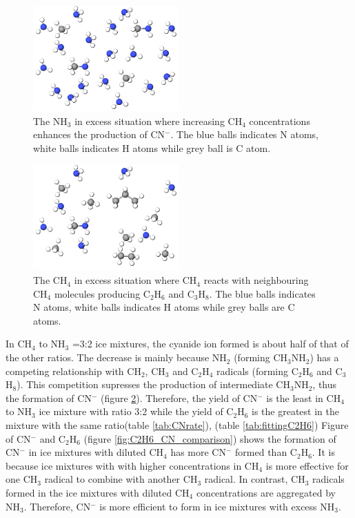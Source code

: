 \begin{figure}
\centering
\includegraphics[width=0.5\textwidth]{figures/ammonia_dominating.png}
\caption{The NH$_3$ in excess situation where increasing CH$_4$ concentrations enhances the production of CN$^-$. The blue balls indicates N atoms, white balls indicates H atoms while grey ball is C atom.}
\label{fig:NH3_dominated}
\end{figure}


\begin{figure}
\centering
\includegraphics[width=0.5\textwidth]{figures/methane_dominating.png}
\caption{The CH$_4$ in excess situation where CH$_4$ reacts with neighbouring CH$_4$ molecules producing C$_2$H$_6$ and C$_3$H$_8$. The blue balls indicates N atoms, white balls indicates H atoms while grey balls are C atoms.}
\label{fig:CH4_dominated}
\end{figure}

In CH$_4$ to NH$_3$ =3:2 ice mixtures, the cyanide ion formed is about half of that of the other ratios. The decrease is mainly because NH$_2$ (forming CH$_3$NH$_2$) has a competing relationship with CH$_2$, CH$_3$ and C$_2$H$_4$ radicals (forming C$_2$H$_6$ and C$_3$H$_8$). This competition supresses the production of intermediate CH$_3$NH$_2$, thus the formation of CN$^-$ (figure \ref{fig:CH4_dominated}). Therefore, the yield of CN$^-$ is the least in CH$_4$ to NH$_3$ ice mixture with ratio 3:2 while the yield of C$_2$H$_6$ is the greatest in the mixture with the same ratio(table \ref{tab:CNrate}), (table \ref{tab:fittingC2H6}) Figure of CN$^-$ and C$_2$H$_6$ (figure \ref{fig:C2H6_CN_comparison}) shows the formation of CN$^-$ in ice mixtures with diluted CH$_4$ has more CN$^-$ formed than C$_2$H$_6$. It is because ice mixtures with with higher concentrations in CH$_4$ is more effective for one CH$_3$ radical to combine with another CH$_3$ radical. In contrast, CH$_3$ radicals formed in the ice mixtures with diluted CH$_4$ concentrations are aggregated by NH$_3$. Therefore, CN$^-$ is more efficient to form in ice mixtures with excess NH$_3$.\\


